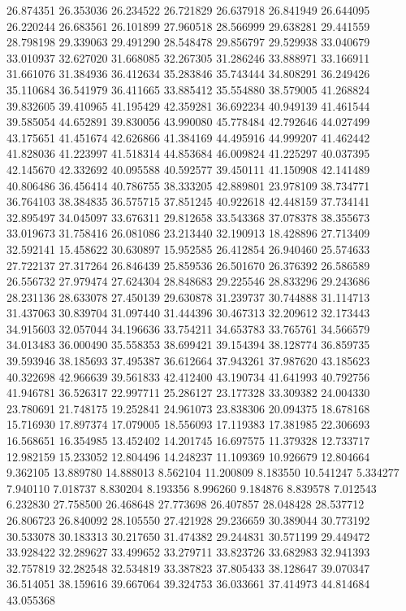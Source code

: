 26.874351
26.353036
26.234522
26.721829
26.637918
26.841949
26.644095
26.220244
26.683561
26.101899
27.960518
28.566999
29.638281
29.441559
28.798198
29.339063
29.491290
28.548478
29.856797
29.529938
33.040679
33.010937
32.627020
31.668085
32.267305
31.286246
33.888971
33.166911
31.661076
31.384936
36.412634
35.283846
35.743444
34.808291
36.249426
35.110684
36.541979
36.411665
33.885412
35.554880
38.579005
41.268824
39.832605
39.410965
41.195429
42.359281
36.692234
40.949139
41.461544
39.585054
44.652891
39.830056
43.990080
45.778484
42.792646
44.027499
43.175651
41.451674
42.626866
41.384169
44.495916
44.999207
41.462442
41.828036
41.223997
41.518314
44.853684
46.009824
41.225297
40.037395
42.145670
42.332692
40.095588
40.592577
39.450111
41.150908
42.141489
40.806486
36.456414
40.786755
38.333205
42.889801
23.978109
38.734771
36.764103
38.384835
36.575715
37.851245
40.922618
42.448159
37.734141
32.895497
34.045097
33.676311
29.812658
33.543368
37.078378
38.355673
33.019673
31.758416
26.081086
23.213440
32.190913
18.428896
27.713409
32.592141
15.458622
30.630897
15.952585
26.412854
26.940460
25.574633
27.722137
27.317264
26.846439
25.859536
26.501670
26.376392
26.586589
26.556732
27.979474
27.624304
28.848683
29.225546
28.833296
29.243686
28.231136
28.633078
27.450139
29.630878
31.239737
30.744888
31.114713
31.437063
30.839704
31.097440
31.444396
30.467313
32.209612
32.173443
34.915603
32.057044
34.196636
33.754211
34.653783
33.765761
34.566579
34.013483
36.000490
35.558353
38.699421
39.154394
38.128774
36.859735
39.593946
38.185693
37.495387
36.612664
37.943261
37.987620
43.185623
40.322698
42.966639
39.561833
42.412400
43.190734
41.641993
40.792756
41.946781
36.526317
22.997711
25.286127
23.177328
33.309382
24.004330
23.780691
21.748175
19.252841
24.961073
23.838306
20.094375
18.678168
15.716930
17.897374
17.079005
18.556093
17.119383
17.381985
22.306693
16.568651
16.354985
13.452402
14.201745
16.697575
11.379328
12.733717
12.982159
15.233052
12.804496
14.248237
11.109369
10.926679
12.804664
9.362105
13.889780
14.888013
8.562104
11.200809
8.183550
10.541247
5.334277
7.940110
7.018737
8.830204
8.193356
8.996260
9.184876
8.839578
7.012543
6.232830
27.758500
26.468648
27.773698
26.407857
28.048428
28.537712
26.806723
26.840092
28.105550
27.421928
29.236659
30.389044
30.773192
30.533078
30.183313
30.217650
31.474382
29.244831
30.571199
29.449472
33.928422
32.289627
33.499652
33.279711
33.823726
33.682983
32.941393
32.757819
32.282548
32.534819
33.387823
37.805433
38.128647
39.070347
36.514051
38.159616
39.667064
39.324753
36.033661
37.414973
44.814684
43.055368
